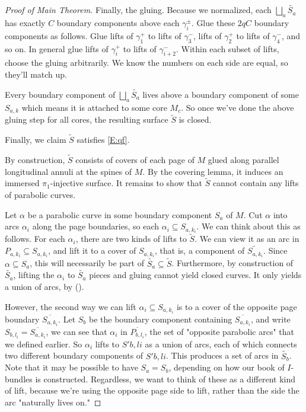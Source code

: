 \documentclass[12pt]{amsart}
\theoremstyle{definition}
\theoremstyle{remark}
\newcommand{\cin}{\subseteq}
\begin{document}
\begin{proof}[Proof of Main Theorem]
Finally, the gluing. Because we normalized, each $\bigsqcup_a \widetilde{S_a}$ has
exactly $C$ boundary components above each $\gamma_i^\pm$.  Glue these $2qC$
boundary components as follows. Glue lifts of $\gamma_1^+$ to lifts of
$\gamma_3^-$, lifts of $\gamma_2^+$ to lifts of $\gamma_4^-$, and so on. In
general glue lifts of $\gamma_i^+$ to lifts of $\gamma_{i+2}^-$. Within each
subset of lifts, choose the gluing arbitrarily. We know the numbers on each
side are equal, so they'll match up.

Every boundary component of $\bigsqcup_a \widetilde{S_a}$ lives above a boundary component
of some $S_{a,k}$ which means it is attached to some core $M_c$. So once we've done
the above gluing step for all cores, the resulting surface $\widetilde{S}$ is closed.


Finally, we claim $\widetilde{S}$ satisfies \eqref{E:qf}.


By construction, $\widetilde{S}$ consists of covers of each page of $M$ glued along
parallel longitudinal annuli at the spines of $M$. By the covering lemma, it
induces an immersed $\pi_1$-injective surface. It remains to show that
$\widetilde{S}$ cannot contain any lifts of parabolic curves.

Let $\alpha$ be a parabolic curve in some boundary component $S_a$ of $M$. Cut
$\alpha$ into arcs $\alpha_i$ along the page boundaries, so each $\alpha_i \cin
S_{a,k_i}$.  We can think about this as follows. For each $\alpha_i$, there are two
kinds of lifts to $\widetilde{S}$. We can view it as an arc in $P_{a,k_i} \cin
S_{a,k_i}$, and lift it to a cover of $S_{a,k_i}$, that is, a component of
$\widetilde{S_{a,k_i}}$. Since $\alpha \cin S_a$, this will necessarily be part
of $\widetilde{S_a} \cin \widetilde{S}$. Furthermore, by construction of
$\widetilde{S_a}$, lifting the $\alpha_i$ to $\widetilde{S_a}$ pieces and
gluing cannot yield closed curves.  It only yields a union of arcs, by (\dag).

However, the second way we can lift $\alpha_i \cin S_{a,k_i}$ is to a cover of the
opposite page boundary $\overline{S_{a,k_i}}$. Let $S_b$ be the boundary component
containing $\overline{S_{a,k_i}}$, and write $S_{b,l_i} = \overline{S_{a,k_i}}$, we can see that $\alpha_i$
in $\overline{P_{b,l_i}}$, the set of "opposite parabolic arcs" that we defined earlier.
So $\alpha_i$ lifts to $S'b,li$ as a union of arcs, each of which connects two
different boundary components of $S'b,li$. This produces a set of arcs in
$\widetilde{S_b}$. Note that it may be possible to have $S_a = S_b$, depending on
how our book of $I$-bundles is constructed.  Regardless, we want to think of
these as a different kind of lift, because we're using the opposite page side
to lift, rather than the side the arc "naturally lives on."


\end{proof}
\end{document}
